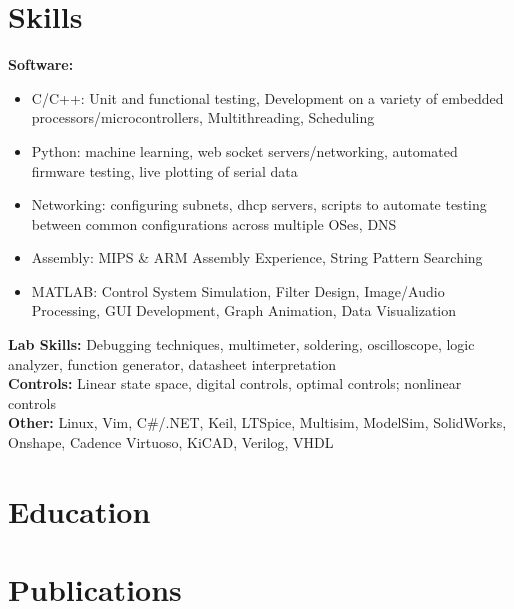 \documentclass[11pt, a4paper]{article}
\begin{document}
\section*{Skills}
{\scriptsize
  \textbf{Software:}
  \begin{itemize}[noitemsep] %
    \item C/C++: Unit and functional testing, Development on a variety of embedded processors/microcontrollers, Multithreading, Scheduling
    \item Python: machine learning, web socket servers/networking, automated firmware testing, live plotting of serial data
    \item Networking: configuring subnets, dhcp servers, scripts to automate testing between common configurations across multiple OSes, DNS
    \item Assembly: MIPS \& ARM Assembly Experience, String Pattern Searching
    \item MATLAB: Control System Simulation, Filter Design, Image/Audio Processing, GUI Development, Graph Animation, Data Visualization
  \end{itemize}
  \textbf{Lab Skills:} Debugging techniques, multimeter, soldering, oscilloscope, logic analyzer, function generator, datasheet interpretation\\
  \textbf{Controls:} Linear state space, digital controls, optimal controls; nonlinear controls\\
  \textbf{Other:} Linux, Vim, C\#/.NET, Keil, LTSpice, Multisim, ModelSim, SolidWorks, Onshape, Cadence Virtuoso, KiCAD, Verilog, VHDL\par\noindent
}

\section*{Education}
{\scriptsize
  \educationSimple
}

\section*{Publications}
{\scriptsize
  \publications
}

\end{document}
